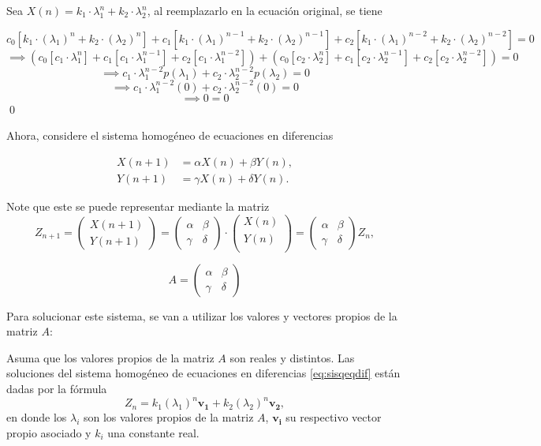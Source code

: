 Sea $X(n)=k_1\cdot \lambda_1^n+k_2\cdot \lambda_2^n$, al reemplazarlo en la ecuación original, se tiene

$$c_0[k_1\cdot (\lambda_1)^n+k_2\cdot (\lambda_2)^n]+c_1[k_1\cdot (\lambda_1)^{n-1}+k_2\cdot (\lambda_2)^{n-1}]+c_2[k_1\cdot (\lambda_1)^{n-2}+k_2\cdot (\lambda_2)^{n-2}]=0$$
$$\implies (c_0[c_1\cdot \lambda_1^n]+c_1[c_1\cdot \lambda_1^{n-1}]+c_2[c_1\cdot \lambda_1^{n-2}])+(c_0[c_2\cdot \lambda_2^n]+c_1[c_2\cdot \lambda_2^{n-1}]+c_2[c_2\cdot \lambda_2^{n-2}])=0$$
$$\implies c_1\cdot\lambda_1^{n-2}p(\lambda_1)+c_2\cdot\lambda_2^{n-2}p(\lambda_2)=0$$
$$\implies c_1\cdot\lambda_1^{n-2}(0)+c_2\cdot\lambda_2^{n-2}(0)=0$$
$$\implies 0=0$$ \qed

Ahora, considere el sistema homogéneo de ecuaciones en diferencias

\begin{align}\label{eq:sisqeqdif}
    X(n+1) &= \alpha X(n) + \beta Y(n), \\
    Y(n+1) &=\gamma X(n) + \delta Y(n). \nonumber
\end{align}

Note que este se puede representar mediante la matriz 
$$Z_{n+1}=\begin{pmatrix}
    X(n+1) \\
    Y(n+1) 
    \end{pmatrix}=
    \begin{pmatrix}
    \alpha & \beta\\
    \gamma  & \delta 
    \end{pmatrix} \cdot 
    \begin{pmatrix}
    X(n) \\
    Y(n) \\
    \end{pmatrix}=
    \begin{pmatrix}
        \alpha & \beta\\
        \gamma  & \delta 
        \end{pmatrix} Z_n,$$

$$ A = \begin{pmatrix}
    \alpha & \beta\\
    \gamma  & \delta 
    \end{pmatrix} $$

Para solucionar este sistema, se van a utilizar los valores y vectores propios de la matriz $A$:

\begin{theorem}
    Asuma que los valores propios de la matriz $A$ son reales y distintos. Las soluciones del sistema homogéneo de ecuaciones en diferencias \ref{eq:sisqeqdif} están dadas por la fórmula
    $$Z_n = k_1 (\lambda_1)^n \mathbf{v_1}+k_2 (\lambda_2)^n \mathbf{v_2},$$
    en donde los $\lambda_i$ son los valores propios de la matriz $A$, $\mathbf{v_i}$ su respectivo vector propio asociado y $k_i$ una constante real.  
\end{theorem}

